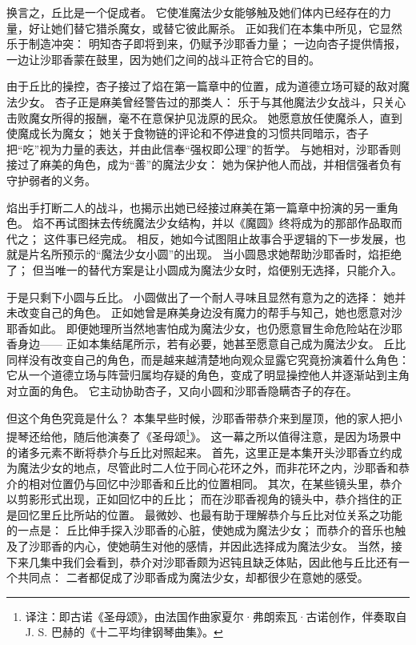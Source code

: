 换言之，丘比是一个促成者。
它使准魔法少女能够触及她们体内已经存在的力量，好让她们替它猎杀魔女，或替它彼此厮杀。
正如我们在本集中所见，它显然乐于制造冲突：
明知杏子即将到来，仍赋予沙耶香力量；
一边向杏子提供情报，一边让沙耶香蒙在鼓里，因为她们之间的战斗正符合它的目的。

由于丘比的操控，杏子接过了焰在第一篇章中的位置，成为道德立场可疑的敌对魔法少女。
杏子正是麻美曾经警告过的那类人：
乐于与其他魔法少女战斗，只关心击败魔女所得的报酬，毫不在意保护见泷原的民众。
她愿意放任使魔杀人，直到使魔成长为魔女；
她关于食物链的评论和不停进食的习惯共同暗示，杏子把“吃”视为力量的表达，并由此信奉“强权即公理”的哲学。
与她相对，沙耶香则接过了麻美的角色，成为“善”的魔法少女：
她为保护他人而战，并相信强者负有守护弱者的义务。

焰出手打断二人的战斗，也揭示出她已经接过麻美在第一篇章中扮演的另一重角色。
焰不再试图抹去传统魔法少女结构，并以《魔圆》终将成为的那部作品取而代之；
这件事已经完成。
相反，她如今试图阻止故事合乎逻辑的下一步发展，也就是片名所预示的“魔法少女小圆”的出现。
当小圆恳求她帮助沙耶香时，焰拒绝了；
但当唯一的替代方案是让小圆成为魔法少女时，焰便别无选择，只能介入。

于是只剩下小圆与丘比。
小圆做出了一个耐人寻味且显然有意为之的选择：
她并未改变自己的角色。
正如她曾是麻美身边没有魔力的帮手与知己，她也愿意对沙耶香如此。
即便她理所当然地害怕成为魔法少女，也仍愿意冒生命危险站在沙耶香身边——
正如本集结尾所示，若有必要，她甚至愿意自己成为魔法少女。
丘比同样没有改变自己的角色，而是越来越清楚地向观众显露它究竟扮演着什么角色：
它从一个道德立场与阵营归属均存疑的角色，变成了明显操控他人并逐渐站到主角对立面的角色。
它主动协助杏子，又向小圆和沙耶香隐瞒杏子的存在。

但这个角色究竟是什么？
本集早些时候，沙耶香带恭介来到屋顶，他的家人把小提琴还给他，随后他演奏了《圣母颂\footnote{%
    译注：即古诺《圣母颂》，由法国作曲家夏尔·弗朗索瓦·古诺创作，伴奏取自 J. S. 巴赫的《十二平均律钢琴曲集》。
}》。
这一幕之所以值得注意，是因为场景中的诸多元素不断将恭介与丘比对照起来。
首先，这里正是本集开头沙耶香立约成为魔法少女的地点，尽管此时二人位于同心花环之外，而非花环之内，沙耶香和恭介的相对位置仍与回忆中沙耶香和丘比的位置相同。
其次，在某些镜头里，恭介以剪影形式出现，正如回忆中的丘比；
而在沙耶香视角的镜头中，恭介挡住的正是回忆里丘比所站的位置。
最微妙、也最有助于理解恭介与丘比对位关系之功能的一点是：
丘比伸手探入沙耶香的心脏，使她成为魔法少女；
而恭介的音乐也触及了沙耶香的内心，使她萌生对他的感情，并因此选择成为魔法少女。
当然，接下来几集中我们会看到，恭介对沙耶香颇为迟钝且缺乏体贴，因此他与丘比还有一个共同点：
二者都促成了沙耶香成为魔法少女，却都很少在意她的感受。

